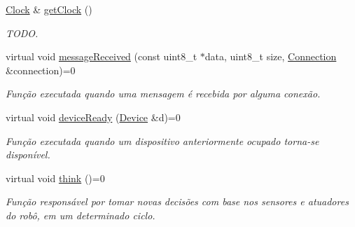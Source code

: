 \begin{DoxyCompactItemize}
\hyperlink{classClock}{Clock} \& \hyperlink{classRobot_af96d177958b4b3087aba65d1cc4c06b6}{get\-Clock} ()
\begin{DoxyCompactList}\small\item\em T\-O\-D\-O. \end{DoxyCompactList}\item 
virtual void \hyperlink{classRobot_ab02c09bdea244d38bcfd0010b9554b6f}{message\-Received} (const uint8\-\_\-t $\ast$data, uint8\-\_\-t size, \hyperlink{classConnection}{Connection} \&connection)=0
\begin{DoxyCompactList}\small\item\em Função executada quando uma mensagem é recebida por alguma conexão. \end{DoxyCompactList}\item 
virtual void \hyperlink{classRobot_aaa0c932d862aed7556b068ebb70a917a}{device\-Ready} (\hyperlink{classDevice}{Device} \&d)=0
\begin{DoxyCompactList}\small\item\em Função executada quando um dispositivo anteriormente ocupado torna-\/se disponível. \end{DoxyCompactList}\item 
virtual void \hyperlink{classRobot_a75cfdd8e35e007abe24ffae66a8ecf1d}{think} ()=0
\begin{DoxyCompactList}\small\item\em Função responsável por tomar novas decisões com base nos sensores e atuadores do robô, em um determinado ciclo. \end{DoxyCompactList}\end{DoxyCompactItemize}
